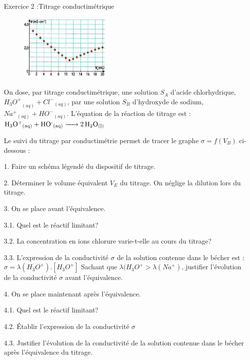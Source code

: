 \documentclass[12pt, french]{article}
\begin{document}
\begin{Box2}{Exercice 2 :Titrage conductimétrique 
 }\begin{figure}
  \begin{center}
    \includegraphics[width=0.4\textwidth]{./Screenshot from 2022-05-11 17-55-37.png}
  \end{center}
\end{figure}



   On dose, par titrage conductimétrique, une solution $S_A$ d'acide chlorhydrique, ${H_3O^+}_{(aq)} + {Cl^-}_{(aq)}$, par une solution
$S_B$ d'hydroxyde de sodium, ${Na^+}_{(aq)} + {HO^-}_{(aq)}$. L'équation de la réaction de titrage est :
   \\$\ce{{H_3O^+}_{(aq)} + {HO^-}_{(aq)} -> 2{H_2O}_{(l)}}$

Le suivi du titrage par conductimétrie permet de tracer le graphe $\sigma = f(V_B)$ ci-dessous :

   1. Faire un schéma légendé du dispositif de titrage.

2. Déterminer le volume équivalent $V_E$ du titrage. On néglige la dilution lors du titrage.

3. On se place avant l'équivalence.

      3.1. Quel est le réactif limitant?

      3.2. La concentration en ions chlorure varie-t-elle au cours du
titrage?

      3.3. L'expression de la conductivité $\sigma$ de la solution contenue
   dans le bécher est : $\sigma = \lambda(H_3O^+).[H_3O^+]$ Sachant que $\lambda( H_3O^+> \lambda( Na^+)$, justifier l'évolution de la conductivité $\sigma$ avant l'équivalence.

   4. On se place maintenant après l'équivalence.

   4.1. Quel est le réactif limitant?

   4.2. Établir l'expression de la conductivité $\sigma$

   4.3. Justifier l'évolution de la conductivité de la solution
contenue dans le bécher après l'équivalence du titrage.
\end{Box2}
\end{document}
